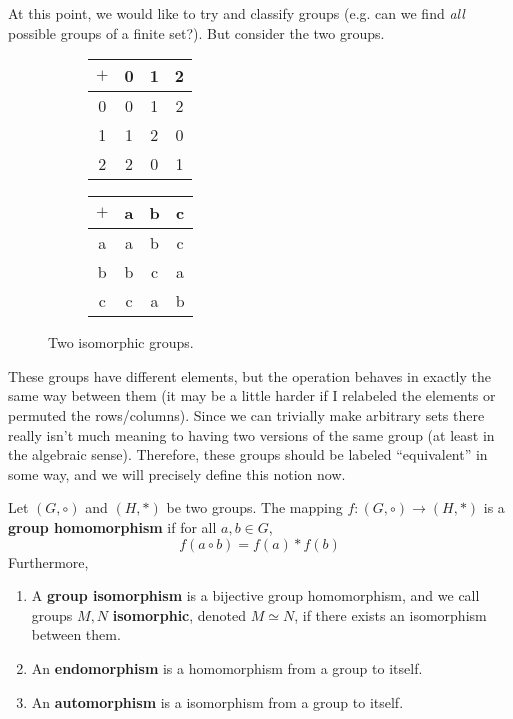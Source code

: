   At this point, we would like to try and classify groups (e.g. can we find \textit{all} possible groups of a finite set?). But consider the two groups. 

  \begin{figure}[H]
    \centering
    \begin{subfigure}[b]{0.48\textwidth}
      \centering
      \begin{tabular}{c|ccc}
        \hline
        $+$ & 0 & 1 & 2 \\
        \hline
        0 & 0 & 1 & 2 \\
        1 & 1 & 2 & 0 \\
        2 & 2 & 0 & 1 \\
        \hline
      \end{tabular}
    \end{subfigure}
    \hfill 
    \begin{subfigure}[b]{0.48\textwidth}
      \centering
      \begin{tabular}{c|ccc}
        \hline
        $+$ & a & b & c \\
        \hline
        a & a & b & c \\
        b & b & c & a \\
        c & c & a & b \\
        \hline
      \end{tabular}
    \end{subfigure}
    \caption{Two isomorphic groups.}
  \end{figure} 

  These groups have different elements, but the operation behaves in exactly the same way between them (it may be a little harder if I relabeled the elements or permuted the rows/columns). Since we can trivially make arbitrary sets there really isn't much meaning to having two versions of the same group (at least in the algebraic sense). Therefore, these groups should be labeled ``equivalent'' in some way, and we will precisely define this notion now. 

  \begin{definition}
    Let $(G, \circ)$ and $(H, *)$ be two groups. The mapping $f: (G, \circ) \longrightarrow (H, *)$ is a \textbf{group homomorphism} if for all $a, b \in G$, 
    \begin{equation}
      f(a \circ b) = f(a) * f(b)
    \end{equation} 
    Furthermore, 
    \begin{enumerate}
      \item A \textbf{group isomorphism} is a bijective group homomorphism, and we call groups $M, N$ \textbf{isomorphic}, denoted $M \simeq N$, if there exists an isomorphism between them. 
      \item An \textbf{endomorphism} is a homomorphism from a group to itself. 
      \item An \textbf{automorphism} is a isomorphism from a group to itself. 
    \end{enumerate}
  \end{definition} 

